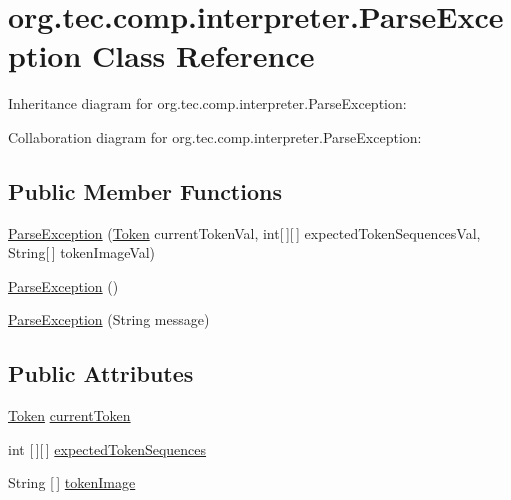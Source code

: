 \hypertarget{classorg_1_1tec_1_1comp_1_1interpreter_1_1_parse_exception}{}\section{org.\+tec.\+comp.\+interpreter.\+Parse\+Exception Class Reference}
\label{classorg_1_1tec_1_1comp_1_1interpreter_1_1_parse_exception}


Inheritance diagram for org.\+tec.\+comp.\+interpreter.\+Parse\+Exception\+:


Collaboration diagram for org.\+tec.\+comp.\+interpreter.\+Parse\+Exception\+:
\subsection*{Public Member Functions}
\begin{DoxyCompactItemize}
\item 
\mbox{\hyperlink{classorg_1_1tec_1_1comp_1_1interpreter_1_1_parse_exception_a1866dd3d0d8c136c15f29c1d8f7577bc}{Parse\+Exception}} (\mbox{\hyperlink{classorg_1_1tec_1_1comp_1_1interpreter_1_1_token}{Token}} current\+Token\+Val, int\mbox{[}$\,$\mbox{]}\mbox{[}$\,$\mbox{]} expected\+Token\+Sequences\+Val, String\mbox{[}$\,$\mbox{]} token\+Image\+Val)
\item 
\mbox{\hyperlink{classorg_1_1tec_1_1comp_1_1interpreter_1_1_parse_exception_a81773d0467bb91c84f4f221cba2222c6}{Parse\+Exception}} ()
\item 
\mbox{\hyperlink{classorg_1_1tec_1_1comp_1_1interpreter_1_1_parse_exception_ae1452449f018cf55d1f2865ea5cb4037}{Parse\+Exception}} (String message)
\end{DoxyCompactItemize}
\subsection*{Public Attributes}
\begin{DoxyCompactItemize}
\item 
\mbox{\hyperlink{classorg_1_1tec_1_1comp_1_1interpreter_1_1_token}{Token}} \mbox{\hyperlink{classorg_1_1tec_1_1comp_1_1interpreter_1_1_parse_exception_aa924715148660d033e7af99dd80c85d9}{current\+Token}}
\item 
int \mbox{[}$\,$\mbox{]}\mbox{[}$\,$\mbox{]} \mbox{\hyperlink{classorg_1_1tec_1_1comp_1_1interpreter_1_1_parse_exception_a8cf72289f91938ae2faa2a001b8c3ae3}{expected\+Token\+Sequences}}
\item 
String \mbox{[}$\,$\mbox{]} \mbox{\hyperlink{classorg_1_1tec_1_1comp_1_1interpreter_1_1_parse_exception_a13a85a0e7a0e560a3191ed4f6be1c127}{token\+Image}}
\end{DoxyCompactItemize}

